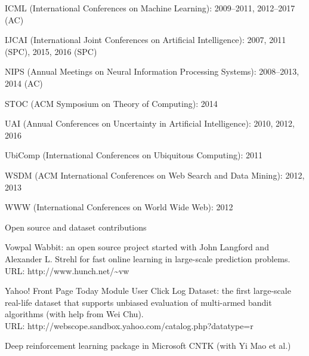 \documentclass[10pt,twoside,letterpaper]{article}
\newcommand{\negitemspace}{\vspace{1mm}}
\begin{document}
\begin{compactitem}
\begin{compactitem}
\item{ICML (International Conferences on Machine Learning): 2009--2011, 2012--2017 (AC)}

\item{IJCAI (International Joint Conferences on Artificial Intelligence): 2007, 2011 (SPC), 2015, 2016 (SPC)}

\item{NIPS (Annual Meetings on Neural Information Processing Systems): 2008--2013, 2014 (AC)}

\item{STOC (ACM Symposium on Theory of Computing): 2014}

\item{UAI (Annual Conferences on Uncertainty in Artificial
Intelligence): 2010, 2012, 2016}

\item{UbiComp (International Conferences on Ubiquitous Computing): 2011}

\item{WSDM (ACM International Conferences on Web Search and Data Mining): 2012, 2013}

\item{WWW (International Conferences on World Wide Web): 2012}

\end{compactitem} \negitemspace


\item{Open source and dataset contributions} \negitemspace

\begin{compactitem}

\item{Vowpal Wabbit: an open source project started with John Langford and
Alexander L. Strehl for fast online learning in large-scale
prediction problems.  URL: http://www.hunch.net/\~{}vw~}

\item{Yahoo! Front Page Today Module User Click Log Dataset: the first large-scale real-life dataset that supports unbiased evaluation of multi-armed bandit algorithms (with help from Wei Chu).  \\ URL: http://webscope.sandbox.yahoo.com/catalog.php?datatype=r}

\item{Deep reinforcement learning package in Microsoft CNTK (with Yi Mao et al.)}

\end{compactitem} \negitemspace

\end{compactitem}
\end{document}
